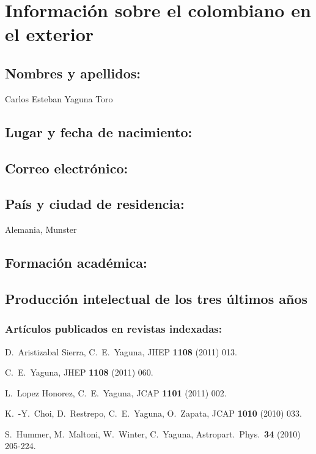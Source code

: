 \section{Información sobre el colombiano en el exterior}
\subsection{Nombres y apellidos: }
Carlos Esteban Yaguna Toro
\subsection{Lugar y fecha de nacimiento: }
\fnyaguna
\subsection{Correo electrónico: }
\emyaguna
\subsection{País y ciudad de residencia: }
Alemania, M\:unster
\subsection{Formación académica:}
\subsection{Producción intelectual de los tres últimos años}
\subsubsection{Artículos publicados en revistas indexadas:}
  D.~Aristizabal Sierra, C.~E.~Yaguna,
  JHEP {\bf 1108 } (2011)  013.

  C.~E.~Yaguna,
  JHEP {\bf 1108 } (2011)  060.

  L.~Lopez Honorez, C.~E.~Yaguna,
  JCAP {\bf 1101 } (2011)  002.

  K.~-Y.~Choi, D.~Restrepo, C.~E.~Yaguna, O.~Zapata,
  JCAP {\bf 1010 } (2010)  033.

  S.~Hummer, M.~Maltoni, W.~Winter, C.~Yaguna,
  Astropart.\ Phys.\  {\bf 34 } (2010)  205-224.


